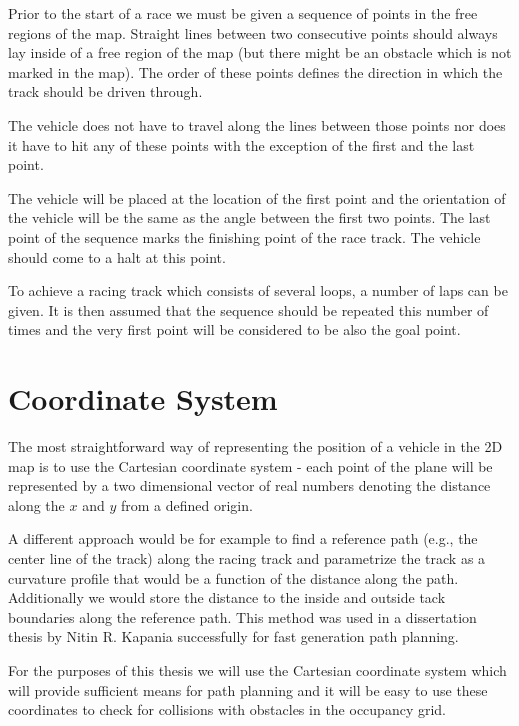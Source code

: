 Prior to the start of a race we must be given a sequence of points in the free regions of the map. Straight lines between two consecutive points should always lay inside of a free region of the map (but there might be an obstacle which is not marked in the map). The order of these points defines the direction in which the track should be driven through.

The vehicle does not have to travel along the lines between those points nor does it have to hit any of these points with the exception of the first and the last point.

The vehicle will be placed at the location of the first point and the orientation of the vehicle will be the same as the angle between the first two points. The last point of the sequence marks the finishing point of the race track. The vehicle should come to a halt at this point.

To achieve a racing track which consists of several loops, a number of laps can be given. It is then assumed that the sequence should be repeated this number of times and the very first point will be considered to be also the goal point.

\section{Coordinate System}

The most straightforward way of representing the position of a vehicle in the 2D map is to use the Cartesian coordinate system - each point of the plane will be represented by a two dimensional vector of real numbers denoting the distance along the $x$ and $y$ from a defined origin.

A different approach would be for example to find a reference path (e.g., the center line of the track) along the racing track and parametrize the track as a curvature profile that would be a function of the distance along the path. Additionally we would store the distance to the inside and outside tack boundaries along the reference path. This method was used in a dissertation thesis by Nitin R. Kapania \cite{dissertation} successfully for fast generation path planning.

For the purposes of this thesis we will use the Cartesian coordinate system which will provide sufficient means for path planning and it will be easy to use these coordinates to check for collisions with obstacles in the occupancy grid.